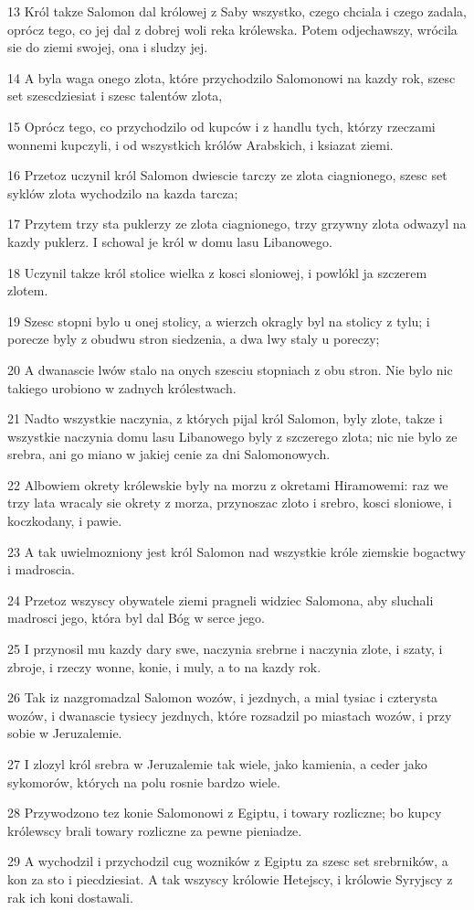\par 13 Król takze Salomon dal królowej z Saby wszystko, czego chciala i czego zadala, oprócz tego, co jej dal z dobrej woli reka królewska. Potem odjechawszy, wrócila sie do ziemi swojej, ona i sludzy jej.
\par 14 A byla waga onego zlota, które przychodzilo Salomonowi na kazdy rok, szesc set szescdziesiat i szesc talentów zlota,
\par 15 Oprócz tego, co przychodzilo od kupców i z handlu tych, którzy rzeczami wonnemi kupczyli, i od wszystkich królów Arabskich, i ksiazat ziemi.
\par 16 Przetoz uczynil król Salomon dwiescie tarczy ze zlota ciagnionego, szesc set syklów zlota wychodzilo na kazda tarcza;
\par 17 Przytem trzy sta puklerzy ze zlota ciagnionego, trzy grzywny zlota odwazyl na kazdy puklerz. I schowal je król w domu lasu Libanowego.
\par 18 Uczynil takze król stolice wielka z kosci sloniowej, i powlókl ja szczerem zlotem.
\par 19 Szesc stopni bylo u onej stolicy, a wierzch okragly byl na stolicy z tylu; i porecze byly z obudwu stron siedzenia, a dwa lwy staly u poreczy;
\par 20 A dwanascie lwów stalo na onych szesciu stopniach z obu stron. Nie bylo nic takiego urobiono w zadnych królestwach.
\par 21 Nadto wszystkie naczynia, z których pijal król Salomon, byly zlote, takze i wszystkie naczynia domu lasu Libanowego byly z szczerego zlota; nic nie bylo ze srebra, ani go miano w jakiej cenie za dni Salomonowych.
\par 22 Albowiem okrety królewskie byly na morzu z okretami Hiramowemi: raz we trzy lata wracaly sie okrety z morza, przynoszac zloto i srebro, kosci sloniowe, i koczkodany, i pawie.
\par 23 A tak uwielmozniony jest król Salomon nad wszystkie króle ziemskie bogactwy i madroscia.
\par 24 Przetoz wszyscy obywatele ziemi pragneli widziec Salomona, aby sluchali madrosci jego, która byl dal Bóg w serce jego.
\par 25 I przynosil mu kazdy dary swe, naczynia srebrne i naczynia zlote, i szaty, i zbroje, i rzeczy wonne, konie, i muly, a to na kazdy rok.
\par 26 Tak iz nazgromadzal Salomon wozów, i jezdnych, a mial tysiac i czterysta wozów, i dwanascie tysiecy jezdnych, które rozsadzil po miastach wozów, i przy sobie w Jeruzalemie.
\par 27 I zlozyl król srebra w Jeruzalemie tak wiele, jako kamienia, a ceder jako sykomorów, których na polu rosnie bardzo wiele.
\par 28 Przywodzono tez konie Salomonowi z Egiptu, i towary rozliczne; bo kupcy królewscy brali towary rozliczne za pewne pieniadze.
\par 29 A wychodzil i przychodzil cug wozników z Egiptu za szesc set srebrników, a kon za sto i piecdziesiat. A tak wszyscy królowie Hetejscy, i królowie Syryjscy z rak ich koni dostawali.


